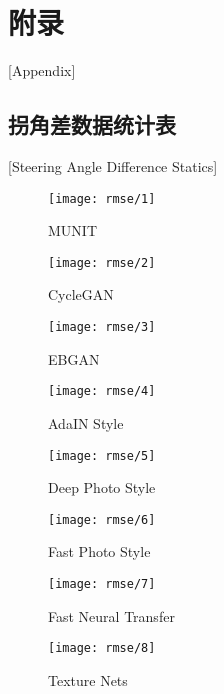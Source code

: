 \chapter{附录}[Appendix]%

\section{拐角差数据统计表}[Steering Angle Difference Statics]
\begin{figure}[h]
    \texttt{[image: rmse/1]} 
    \caption{MUNIT}
\end{figure}
\begin{figure}[h]
    \texttt{[image: rmse/2]} 
    \caption{CycleGAN}
\end{figure}
\begin{figure}[h]
    \texttt{[image: rmse/3]} 
    \caption{EBGAN}
\end{figure}
\begin{figure}[h]
    \texttt{[image: rmse/4]} 
    \caption{AdaIN Style}
\end{figure}
\begin{figure}[h]
    \texttt{[image: rmse/5]} 
    \caption{Deep Photo Style}
\end{figure}
\begin{figure}[h]
    \texttt{[image: rmse/6]} 
    \caption{Fast Photo Style}
\end{figure}
\begin{figure}[h]
    \texttt{[image: rmse/7]} 
    \caption{Fast Neural Transfer}
\end{figure}
\begin{figure}[h]
    \texttt{[image: rmse/8]} 
    \caption{Texture Nets}
\end{figure}